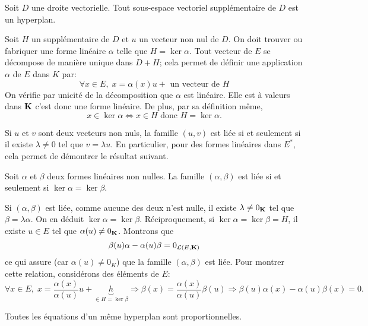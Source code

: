 \begin{propn}
  Soit $D$ une droite vectorielle. Tout sous-espace vectoriel supplémentaire de $D$ est un hyperplan.
\end{propn}
\begin{demo}
Soit $H$ un supplémentaire de $D$ et $u$ un vecteur non nul de $D$. On doit trouver ou fabriquer une forme linéaire $\alpha$ telle que $H=\ker \alpha$.\newline
Tout vecteur de $E$ se décompose de manière unique dans $D + H$; cela permet de définir une application $\alpha$ de $E$ dans $K$ par:
\begin{displaymath}
\forall x\in E, \; x = \alpha(x)u + \text{ un vecteur de }H  
\end{displaymath}
On vérifie par unicité de la décomposition que $\alpha$ est linéaire. Elle est à valeurs dans $\mathbf{K}$ c'est donc une forme linéaire. De plus, par sa définition même, 
\[
  x\in \ker \alpha \Leftrightarrow x\in H \text{ donc } H=\ker \alpha.
\]
\end{demo}
\begin{rem}
Si $u$ et $v$ sont deux vecteurs non nuls, la famille $(u,v)$ est liée si et seulement si il existe $\lambda\neq 0$ tel que $v=\lambda u$. En particulier, pour des formes linéaires dans $E^*$, cela permet de démontrer le résultat suivant. 
\end{rem}

\begin{propn}
 Soit $\alpha$ et $\beta$ deux formes linéaires non nulles. La famille $(\alpha, \beta)$ est liée si et seulement si $\ker \alpha=\ker \beta$.
\end{propn}
\begin{demo}
Si $(\alpha,\beta)$ est liée, comme aucune des deux n'est nulle, il existe $\lambda\neq 0_{\mathbf{K}}$ tel que $\beta = \lambda \alpha$. On en déduit $\ker \alpha = \ker \beta$.\newline
Réciproquement, si $\ker \alpha = \ker \beta = H$, il existe $u\in E$ tel que $\alpha(u)\neq 0_{\mathbf{K}}$. Montrons que 
\begin{displaymath}
  \beta(u)\alpha - \alpha(u)\beta = 0_{\mathcal{L}(E,\mathbf{K})}
\end{displaymath}
ce qui assure (car $\alpha(u)\neq 0_K$) que la famille $(\alpha,\beta)$ est liée. Pour montrer cette relation, considérons des éléments de $E$:
\begin{displaymath}
\forall x\in E,\; x = \frac{\alpha(x)}{\alpha(u)}u + \underset{\in H = \ker \beta}{\underbrace{h}}
\Rightarrow
\beta(x) = \frac{\alpha(x)}{\alpha(u)}\beta(u) 
\Rightarrow
\beta(u)\alpha(x) - \alpha(u)\beta(x) = 0.
\end{displaymath}
\end{demo}
Toutes les équations d'un même hyperplan sont proportionnelles.

